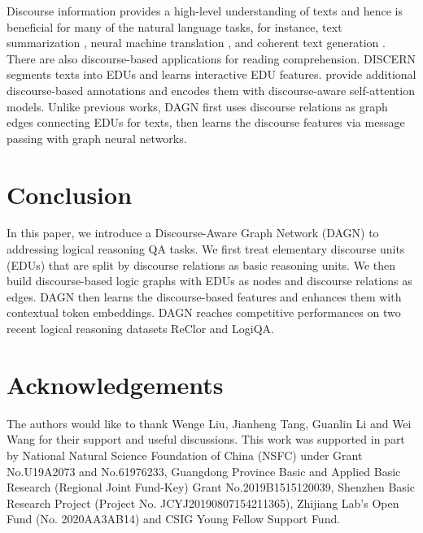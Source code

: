 \documentclass[11pt]{article}
\newcommand{\moe}[1]{{\color{black} #1}}
\begin{document}
Discourse information provides a high-level understanding of texts and hence is beneficial for many of the natural language tasks, for instance, text summarization \cite{cohan-etal-2018-discourse, joty-etal-2019-discourse, xu-etal-2020-discourse, feng2020dialogue}, neural machine translation \cite{voita2018context}, and coherent text generation \cite{wang2020consistency, bosselut2018discourse}. 
There are also discourse-based applications for reading comprehension. DISCERN \cite{gao2020discern} segments texts into EDUs and learns interactive EDU features.
\citet{mihaylov-frank-2019-discourse} provide additional discourse-based annotations and encodes them with discourse-aware self-attention models. 
Unlike previous works, DAGN first uses discourse relations as graph edges connecting EDUs for texts, then learns the discourse features via message passing with graph neural networks. 








\section{Conclusion}
\vspace{-1mm}
\moe{In this paper, we introduce a Discourse-Aware Graph Network (DAGN) to addressing logical reasoning QA tasks. We first treat elementary discourse units (EDUs) that are split by discourse relations as basic reasoning units. We then build discourse-based logic graphs with EDUs as nodes and discourse relations as edges. DAGN then learns the discourse-based features and enhances them with contextual token embeddings. DAGN reaches competitive performances on two recent logical reasoning datasets ReClor and LogiQA.}




\section*{Acknowledgements}
\vspace{-1mm}
The authors would like to thank Wenge Liu, Jianheng Tang, Guanlin Li and Wei Wang for their support and useful discussions. 
This work was supported in part by National Natural Science Foundation of China (NSFC) under Grant No.U19A2073 and No.61976233, Guangdong Province Basic and Applied Basic Research (Regional Joint Fund-Key) Grant No.2019B1515120039,  Shenzhen Basic Research Project (Project No. JCYJ20190807154211365), Zhijiang Lab’s Open Fund (No. 2020AA3AB14) and CSIG Young Fellow Support Fund.
\end{document}
